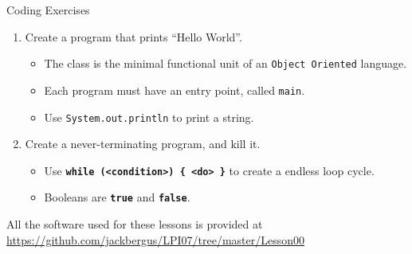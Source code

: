 \documentclass{beamer}
\begin{document}
\begin{frame}{Coding Exercises}
	\begin{enumerate}
		\item Create a program that prints ``Hello World''.
		\begin{itemize}
			\item The class is the minimal functional unit of an \texttt{Object Oriented} language.
			\item Each program must have an entry point, called \texttt{main}.
			\item Use \texttt{System.out.println} to print a string.
		\end{itemize}
		\item Create a never-terminating program, and kill it.
		\begin{itemize}
			\item Use \texttt{\textbf{while (<condition>) \{ <do> \}}} to create a endless loop cycle.
			\item Booleans are \texttt{\textbf{true}} and \texttt{\textbf{false}}.
		\end{itemize}
	\end{enumerate}


All the software used for these lessons is provided at \url{https://github.com/jackbergus/LPI07/tree/master/Lesson00}
\end{frame}
\end{document}
